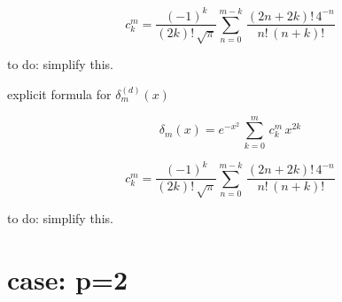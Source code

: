 \documentclass{article}
\begin{document}
\begin{equation*}
 c_k^m = \frac{(-1)^k}{ (2k)!  \, \sqrt{\pi}} \sum_{n=0}^{m-k} \, \frac{ (2n+2k)! \, 4^{-n} }{  n! \, (n+k)!  }
\end{equation*}

\begin{flushleft}
to do: simplify this.
\end{flushleft}


\begin{flushleft}
explicit formula for $ \delta^{(d)}_m(x) $
\end{flushleft}

\begin{equation*}
\delta_m(x) = e^{-x^2} \, \sum_{k=0}^m \, c_k^m \, x^{2k}
\end{equation*}

\begin{equation*}
 c_k^m = \frac{(-1)^k}{ (2k)!  \, \sqrt{\pi}} \sum_{n=0}^{m-k} \, \frac{ (2n+2k)! \, 4^{-n} }{  n! \, (n+k)!  }
\end{equation*}

\begin{flushleft}
to do: simplify this.
\end{flushleft}



\section{case: p=2}
\end{document}
